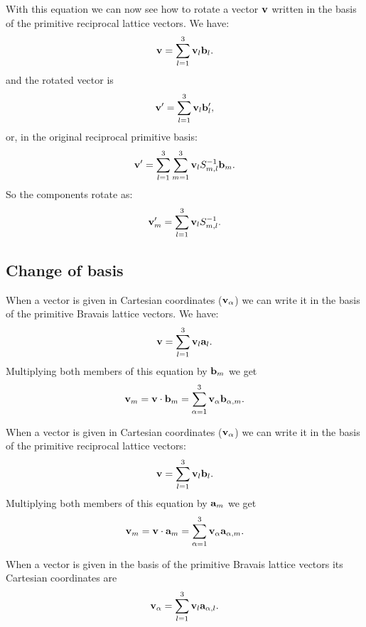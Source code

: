 \documentclass[12pt,a4paper,twoside]{report}
\begin{document}
With this equation we can now see how to rotate 
a vector ${\bf v}$ written in the basis of
the primitive reciprocal lattice vectors. We have:
\begin{equation}
{\bf v} = \sum_{l=1}^3 {\bf v}_l {\bf b}_l.
\end{equation}
and the rotated vector is
\begin{equation}
{\bf v}' = \sum_{l=1}^3 {\bf v}_l {\bf b}'_l,
\end{equation}
or, in the original reciprocal primitive basis:
\begin{equation}
{\bf v}' = \sum_{l=1}^3 \sum_{m=1}^3 {\bf v}_l S^{-1}_{m,l} {\bf b}_m.
\end{equation}
So the components rotate as:
\begin{equation}
{\bf v}'_m = \sum_{l=1}^3 {\bf v}_l S^{-1}_{m,l}.
\label{rotreccomp}
\end{equation}

\subsection{Change of basis}
When a vector is given in Cartesian coordinates (${\bf v}_{\alpha}$) we can write it in the basis of the primitive Bravais lattice vectors.
We have:
\begin{equation}
{\bf v}= \sum_{l=1}^3 {\bf v}_l {\bf a}_l.
\end{equation}
Multiplying both members of this equation by ${\bf b}_m$
we get
\begin{equation}
{\bf v}_m= {\bf v} \cdot {\bf b}_m=\sum_{\alpha=1}^3
{\bf v}_{\alpha} {\bf b}_{\alpha,m}.
\end{equation}

When a vector is given in Cartesian coordinates
(${\bf v}_{\alpha}$) we can write it in the basis of the primitive reciprocal lattice vectors:
\begin{equation}
{\bf v}= \sum_{l=1}^3 {\bf v}_l {\bf b}_l.
\end{equation}
Multiplying both members of this equation by ${\bf a}_m$
we get
\begin{equation}
{\bf v}_m= {\bf v} \cdot {\bf a}_m=\sum_{\alpha=1}^3
{\bf v}_{\alpha} {\bf a}_{\alpha,m}.
\end{equation}

When a vector is given in the basis of the primitive Bravais lattice vectors its Cartesian coordinates are
\begin{equation}
{\bf v}_\alpha= \sum_{l=1}^3 {\bf v}_l {\bf a}_{\alpha,l}.
\end{equation}
\end{document}
